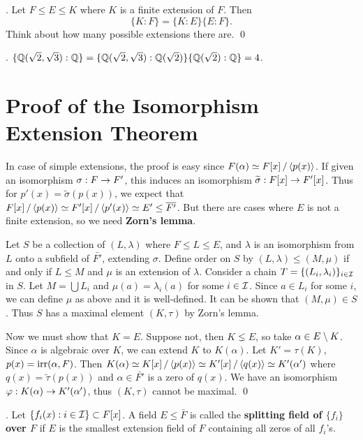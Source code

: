 \cor. Let \(F \leq E \leq K\) where \(K\) is a finite extension of \(F\). Then
\[
    \{K : F\} = \{K : E\} \{E : F\}.
\]
\pf Think about how many possible extensions there are. \qed

\ex. \(\{\mathbb{Q}(\sqrt{2}, \sqrt{3}) : \mathbb{Q}\} = \{\mathbb{Q}(\sqrt{2}, \sqrt{3}) : \mathbb{Q}(\sqrt{2})\} \{\mathbb{Q}(\sqrt{2}) : \mathbb{Q}\} = 4\).

\section*{Proof of the Isomorphism Extension Theorem}

In case of simple extensions, the proof is easy since \(F(\alpha) \simeq F[x] \operatorname{/} \left\langle p(x) \right\rangle\). If given an isomorphism \(\sigma : F \rightarrow F'\), this induces an isomorphism \(\widetilde{\sigma} : F[x] \rightarrow F'[x]\). Thus for \(p'(x) = \tilde{\sigma}(p(x))\), we expect that \(F[x] \quotient \span{p(x)} \simeq F'[x] \quotient \span{p'(x)} \simeq E' \leq \bar{F'}\). But there are cases where \(E\) is not a finite extension, so we need \textbf{Zorn's lemma}.

\pf Let \(S\) be a collection of \((L, \lambda)\) where \(F \leq L \leq E\), and \(\lambda\) is an isomorphism from \(L\) onto a subfield of \(\bar{F'}\), extending \(\sigma\). Define order on \(S\) by \((L, \lambda) \leq (M, \mu)\) if and only if \(L \leq M\) and \(\mu\) is an extension of \(\lambda\).
Consider a chain \(T = \{(L_i, \lambda_i)\}_{i \in \mathcal{I}}\) in \(S\). Let \(M = \bigcup L_i\) and \(\mu(a) = \lambda_i(a)\) for some \(i \in \mathcal{I}\). Since \(a \in L_i\) for some \(i\), we can define \(\mu\) as above and it is well-defined. It can be shown that \((M, \mu) \in S\). Thus \(S\) has a maximal element \((K, \tau)\) by Zorn's lemma.

Now we must show that \(K = E\). Suppose not, then \(K \lneq E\), so take \(\alpha \in E \setminus K\). Since \(\alpha\) is algebraic over \(K\), we can extend \(K\) to \(K(\alpha)\). Let \(K' = \tau(K)\), \(p(x) = \mathrm{irr}(\alpha, F)\). Then \(K(\alpha) \simeq K[x] \operatorname{/} \left\langle p(x) \right\rangle \simeq K'[x] \operatorname{/} \left\langle q(x) \right\rangle \simeq K'(\alpha')\) where \(q(x) = \tilde{\tau}(p(x))\) and \(\alpha \in \bar{F'}\) is a zero of \(q(x)\). We have an isomorphism \(\varphi : K(\alpha) \rightarrow K'(\alpha')\), thus \((K, \tau)\) cannot be maximal. \qed

\pagebreak


.  Let \(\{f_i(x) : i \in \mathcal{I}\} \subset F[x]\). A field \(E \leq \bar{F}\) is called the \textbf{splitting field of \(\{f_i\}\) over \(F\)} if \(E\) is the smallest extension field of \(F\) containing all zeros of all \(f_i\)'s.

